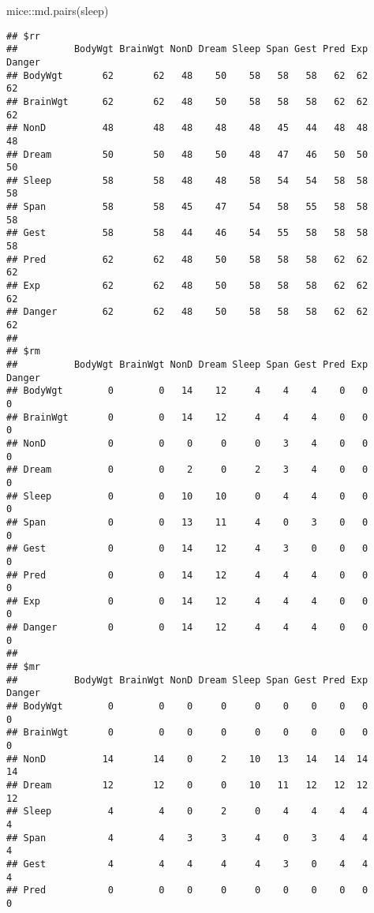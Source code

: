 \documentclass[
]{article}
\newenvironment{Shaded}{\begin{snugshade}}{\end{snugshade}}
\newcommand{\FunctionTok}[1]{\textcolor[rgb]{0.00,0.00,0.00}{#1}}
\newcommand{\NormalTok}[1]{#1}
\newcommand{\SpecialCharTok}[1]{\textcolor[rgb]{0.00,0.00,0.00}{#1}}
\begin{document}
\begin{Shaded}
\begin{Highlighting}[]
\NormalTok{mice}\SpecialCharTok{::}\FunctionTok{md.pairs}\NormalTok{(sleep)}
\end{Highlighting}
\end{Shaded}

\begin{verbatim}
## $rr
##          BodyWgt BrainWgt NonD Dream Sleep Span Gest Pred Exp Danger
## BodyWgt       62       62   48    50    58   58   58   62  62     62
## BrainWgt      62       62   48    50    58   58   58   62  62     62
## NonD          48       48   48    48    48   45   44   48  48     48
## Dream         50       50   48    50    48   47   46   50  50     50
## Sleep         58       58   48    48    58   54   54   58  58     58
## Span          58       58   45    47    54   58   55   58  58     58
## Gest          58       58   44    46    54   55   58   58  58     58
## Pred          62       62   48    50    58   58   58   62  62     62
## Exp           62       62   48    50    58   58   58   62  62     62
## Danger        62       62   48    50    58   58   58   62  62     62
## 
## $rm
##          BodyWgt BrainWgt NonD Dream Sleep Span Gest Pred Exp Danger
## BodyWgt        0        0   14    12     4    4    4    0   0      0
## BrainWgt       0        0   14    12     4    4    4    0   0      0
## NonD           0        0    0     0     0    3    4    0   0      0
## Dream          0        0    2     0     2    3    4    0   0      0
## Sleep          0        0   10    10     0    4    4    0   0      0
## Span           0        0   13    11     4    0    3    0   0      0
## Gest           0        0   14    12     4    3    0    0   0      0
## Pred           0        0   14    12     4    4    4    0   0      0
## Exp            0        0   14    12     4    4    4    0   0      0
## Danger         0        0   14    12     4    4    4    0   0      0
## 
## $mr
##          BodyWgt BrainWgt NonD Dream Sleep Span Gest Pred Exp Danger
## BodyWgt        0        0    0     0     0    0    0    0   0      0
## BrainWgt       0        0    0     0     0    0    0    0   0      0
## NonD          14       14    0     2    10   13   14   14  14     14
## Dream         12       12    0     0    10   11   12   12  12     12
## Sleep          4        4    0     2     0    4    4    4   4      4
## Span           4        4    3     3     4    0    3    4   4      4
## Gest           4        4    4     4     4    3    0    4   4      4
## Pred           0        0    0     0     0    0    0    0   0      0

\end{verbatim}
\end{document}
